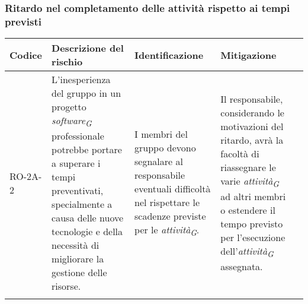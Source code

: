 \subsubsection{Ritardo nel completamento delle attività rispetto ai tempi previsti} \label{sec:ritAttivita}
\begin{table}[H]
    \centering
    \begin{tabularx}{\textwidth}{l>{\RaggedRight}X>{\RaggedRight}X>{\RaggedRight}X>{\RaggedRight}X}
    \toprule
    \rowcolor{gray!50}
    \textbf{Codice} & \textbf{Descrizione del rischio} & \textbf{Identificazione} & \textbf{Mitigazione}\\
    \midrule
    \addlinespace 
    RO-2A-2 & 
    L'inesperienza del gruppo in un progetto \textit{software}\textsubscript{\textit{G}} professionale potrebbe portare a superare i tempi preventivati, specialmente a causa delle nuove tecnologie e della necessità di migliorare la gestione delle risorse.& 
    I membri del gruppo devono segnalare al responsabile eventuali difficoltà nel rispettare le scadenze previste per le \textit{attività}\textsubscript{\textit{G}}.&
    Il responsabile, considerando le motivazioni del ritardo, avrà la facoltà di riassegnare le varie \textit{attività}\textsubscript{\textit{G}} ad altri membri o estendere il tempo previsto per l'esecuzione dell'\textit{attività}\textsubscript{\textit{G}} assegnata.\\
    \bottomrule
    \addlinespace 
    \end{tabularx}
\end{table}

